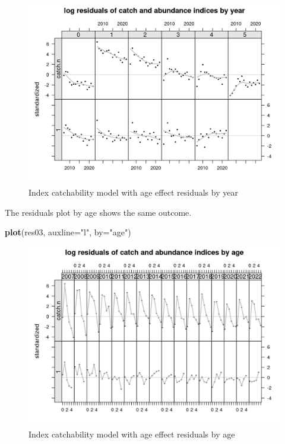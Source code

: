 \documentclass[
]{book}
\newenvironment{Shaded}{\begin{snugshade}}{\end{snugshade}}
\newcommand{\AttributeTok}[1]{\textcolor[rgb]{0.13,0.29,0.53}{#1}}
\newcommand{\FunctionTok}[1]{\textcolor[rgb]{0.13,0.29,0.53}{\textbf{#1}}}
\newcommand{\NormalTok}[1]{#1}
\newcommand{\StringTok}[1]{\textcolor[rgb]{0.31,0.60,0.02}{#1}}
\begin{document}
\begin{figure}
\centering
\includegraphics{_bookdown_files/_main_files/figure-html/qageresbyyear-1.png}
\caption{\label{fig:qageresbyyear}Index catchability model with age effect residuals by year}
\end{figure}

The residuals plot by age shows the same outcome.

\begin{Shaded}
\begin{Highlighting}[]
\FunctionTok{plot}\NormalTok{(res03, }\AttributeTok{auxline=}\StringTok{"l"}\NormalTok{, }\AttributeTok{by=}\StringTok{"age"}\NormalTok{)}
\end{Highlighting}
\end{Shaded}

\begin{figure}
\centering
\includegraphics{_bookdown_files/_main_files/figure-html/qageresbyage-1.png}
\caption{\label{fig:qageresbyage}Index catchability model with age effect residuals by age}
\end{figure}
\end{document}
